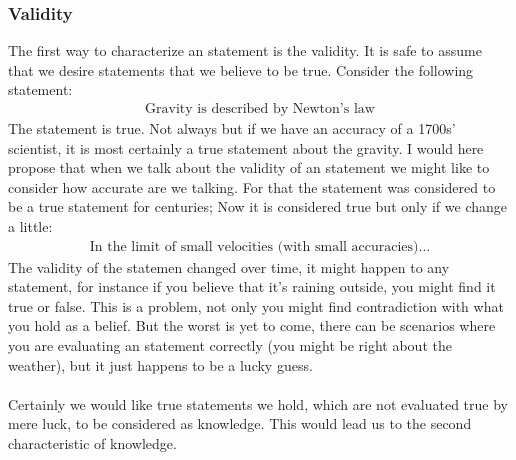 \documentclass[10pt,a4paper]{article}
\begin{document}
                    \subsubsection{Validity} The first way to characterize an statement is the validity. It is safe to assume that we desire statements that we believe to be true. Consider the following statement:
                    \begin{align*}
                        \text{Gravity is described by Newton's law}
                    \end{align*}
                    The statement is true. Not always but if we have an accuracy of a 1700s' scientist, it is most certainly a true statement about the gravity. I would here propose that when we talk about the validity of an statement we might like to consider how accurate are we talking. For that the statement was considered to be a true statement for centuries; Now it is considered true but only if we change a little:
                    \begin{align*}
                        \text{In the limit of small velocities (with small accuracies)...}
                    \end{align*}
                    The validity of the statemen changed over time, it might happen to any statement, for instance if you believe that it's raining outside, you might find it true or false. This is a problem, not only you might find contradiction with what you hold as a belief. But the worst is yet to come, there can be scenarios where you are evaluating an statement correctly (you might be right about the weather), but it just happens to be a lucky guess. 
                    \\
                    \\
                    Certainly we would like true statements we hold, which are not evaluated true by mere luck, to be considered as knowledge. This would lead us to the second characteristic of knowledge.
                    \\
                    \\
\end{document}
